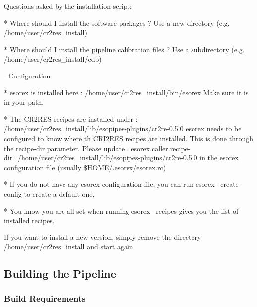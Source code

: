     Questions asked by the installation script:

    * Where should I install the software packages ? 
        Use a new directory (e.g. /home/user/cr2res\_install)

    * Where should I install the pipeline calibration files ?
        Use a subdirectory (e.g. /home/user/cr2res\_install/cdb)

- Configuration

    * esorex is installed here : /home/user/cr2res\_install/bin/esorex 
        Make sure it is in your path.

    * The CR2RES recipes are installed under : /home/user/cr2res\_install/lib/esopipes-plugins/cr2re-0.5.0
        esorex needs to be configured to know where th CRI2RES recipes are installed. This is done through the recipe-dir parameter.
        Please update :
        esorex.caller.recipe-dir=/home/user/cr2res\_install/lib/esopipes-plugins/cr2re-0.5.0
        in the esorex configuration file (usually \$HOME/.esorex/esorex.rc)

    * If you do not have any esorex configuration file, you can run
        esorex --create-config 
        to create a default one.

    * You know you are all set when running 
        esorex --recipes
        gives you the list of installed recipes.

If you want to install a new version, simply remove the directory
/home/user/cr2res\_install and start again.






\subsection{Building the \instrument{} Pipeline}
\label{sec:compile-howto}

\subsubsection{Build Requirements}
\label{sec:compile-requirements}

